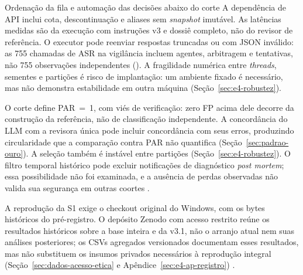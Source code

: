 \begin{chapter}{Ordenação da fila e automação das decisões abaixo do corte}
A dependência de API inclui cota, descontinuação e aliases sem \textit{snapshot} imutável. As latências medidas são da execução com instruções v3 e dossiê completo, não do revisor de referência. O executor pode reenviar respostas truncadas ou com JSON inválido: as 755 chamadas de ASR na vigilância incluem agentes, arbitragem e tentativas, não 755 observações independentes (). A fragilidade numérica entre \textit{threads}, sementes e partições é risco de implantação: um ambiente fixado é necessário, mas não demonstra estabilidade em outra máquina (Seção~\ref{sec:e4-robustez}).

O corte define PAR~=~1, com viés de verificação: zero FP acima dele decorre da construção da referência, não de classificação independente. A concordância do LLM com a revisora única pode incluir concordância com seus erros, produzindo circularidade que a comparação contra PAR não quantifica (Seção~\ref{sec:padrao-ouro}). A seleção também é instável entre partições (Seção~\ref{sec:e4-robustez}). O filtro temporal histórico pode excluir notificações de diagnóstico \textit{post mortem}; essa possibilidade não foi examinada, e a ausência de perdas observadas não valida sua segurança em outras coortes \cite{Jardim2026phdrepo}.

A reprodução da S1 exige o checkout original do Windows, com os bytes históricos do pré-registro. O depósito Zenodo com acesso restrito reúne os resultados históricos sobre a base inteira e da v3.1, não o arranjo atual nem suas análises posteriores; os CSVs agregados versionados documentam esses resultados, mas não substituem os insumos privados necessários à reprodução integral (Seção~\ref{sec:dados-acesso-etica} e Apêndice~\ref{sec:e4-ap-registro}) \cite{Jardim2026phdrepo,Jardim2026zenodoGzcmd301}.


\end{chapter}
